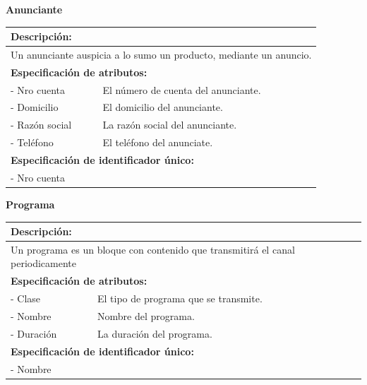 \documentclass[a4paper,10pt]{article}
\begin{document}
    \begin{flushleft}
      \begin{large} \bf{Anunciante} \end{large}
    \end{flushleft}
      \begin{tabular}{| p{2cm} | p{9cm} |}
	\hline
	\multicolumn{2}{|l|}{\bf{Descripci\'on:}} \\
	\hline
	\multicolumn{2}{|l|}{Un anunciante auspicia a lo sumo un producto, mediante un anuncio.} \\
	\hline	
	\multicolumn{2}{|l|}{\bf{Especificaci\'on de atributos:}} \\
	\hline
	- Nro cuenta & El n\'umero de cuenta del anunciante. \\
	\hline \hline
	- Domicilio & El domicilio del anunciante. \\
	\hline \hline
	- Raz\'on \newline social & La raz\'on social del anunciante. \\
	\hline \hline
	- Tel\'efono & El tel\'efono del anunciate. \\
	\hline
	\multicolumn{2}{|l|}{\bf{Especificaci\'on de identificador \'unico:}} \\
	\hline
	\multicolumn{2}{|l|}{- Nro cuenta} \\
	\hline
      \end{tabular}
  \begin{flushleft}
      \begin{large} \bf{Programa} \end{large}
    \end{flushleft}
      \begin{tabular}{| p{2cm} | p{9cm} |}
	\hline
	\multicolumn{2}{|l|}{\bf{Descripci\'on:}} \\
	\hline
	\multicolumn{2}{|l|}{Un programa es un bloque con contenido que transmitir\'a el canal periodicamente} \\
	\hline	
	\multicolumn{2}{|l|}{\bf{Especificaci\'on de atributos:}} \\
	\hline
	- Clase & El tipo de programa que se transmite. \\
	\hline \hline
	- Nombre & Nombre del programa. \\
	\hline \hline
	- Duraci\'on & La duraci\'on del programa.\\
	\hline
	\multicolumn{2}{|l|}{\bf{Especificaci\'on de identificador \'unico:}} \\
	\hline
	\multicolumn{2}{|l|}{- Nombre} \\
	\hline
      \end{tabular}
  
\end{document}
